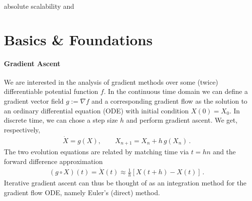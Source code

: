 \documentclass{article}
\begin{document}
absolute scalability and 







\section{Basics \& Foundations} 

\paragraph*{Gradient Ascent} We are interested in the analysis of gradient methods over some (twice) differentiable potential function $f$. In the continuous time domain we can define a gradient vector field $g := \nabla f$ and a corresponding gradient flow as the solution to an ordinary differential equation (ODE) with initial condition $X(0) = X_0$.  In discrete time, we can chose a step size $h$ and perform gradient ascent. We get, respectively,  
\begin{align}
\dot X = g(X), \qquad X_{n+1}  = X_n + h \, g(X_n) \,.
\end{align}
The two evolution equations are related by matching time via $t = hn$ and the forward difference approximation  
\begin{align}
(g \circ X)(t) = \dot X(t) \approx \frac 1h \left[ X(t+h) - X(t) \right] \,.
\label{eq:forward-diff}
\end{align}
Iterative gradient ascent can thus be thought of as an integration method for the gradient flow ODE, namely Euler's (direct) method. 
\end{document}
